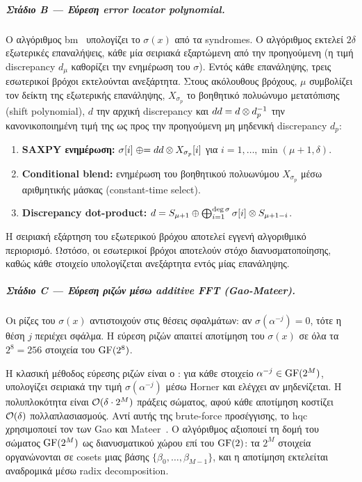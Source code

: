 \subparagraph{Στάδιο B — Εύρεση error locator polynomial.}
Ο αλγόριθμος \gls{bm}~\cite{Berlekamp1968,Massey1969} υπολογίζει το $\sigma(x)$ από τα syndromes.
Ο αλγόριθμος εκτελεί $2\delta$ εξωτερικές επαναλήψεις, κάθε μία
σειριακά εξαρτώμενη από την προηγούμενη (η τιμή discrepancy $d_\mu$
καθορίζει την ενημέρωση του $\sigma$).
Εντός κάθε επανάληψης, τρεις εσωτερικοί βρόχοι εκτελούνται ανεξάρτητα. Στους ακόλουθους βρόχους, $\mu$ συμβολίζει τον δείκτη της εξωτερικής επανάληψης, $X_{\sigma_p}$ το βοηθητικό πολυώνυμο μετατόπισης (shift polynomial), $d$ την αρχική discrepancy και $dd = d \otimes d_p^{-1}$ την κανονικοποιημένη τιμή της ως προς την προηγούμενη μη μηδενική discrepancy $d_p$:

\begin{enumerate}
  \item \textbf{SAXPY ενημέρωση:} $\sigma[i] \mathrel{\oplus}= dd \otimes X_{\sigma_p}[i]$ για $i = 1, \ldots, \min(\mu+1, \delta)$.
  \item \textbf{Conditional blend:} ενημέρωση του βοηθητικού πολυωνύμου
    $X_{\sigma_p}$ μέσω αριθμητικής μάσκας (constant-time select).
  \item \textbf{Discrepancy dot-product:} $d = S_{\mu+1} \oplus
    \bigoplus_{i=1}^{\deg\sigma} \sigma[i] \otimes S_{\mu+1-i}$.
\end{enumerate}
Η σειριακή εξάρτηση του εξωτερικού βρόχου αποτελεί εγγενή αλγοριθμικό
περιορισμό. Ωστόσο, οι εσωτερικοί βρόχοι αποτελούν στόχο διανυσματοποίησης, 
καθώς κάθε στοιχείο υπολογίζεται ανεξάρτητα εντός μίας επανάληψης.

\subparagraph{Στάδιο C — Εύρεση ριζών μέσω additive FFT (Gao-Mateer).}
Οι ρίζες του $\sigma(x)$ αντιστοιχούν στις θέσεις σφαλμάτων: αν
$\sigma(\alpha^{-j}) = 0$, τότε η θέση $j$ περιέχει σφάλμα.
Η εύρεση ριζών απαιτεί αποτίμηση του $\sigma(x)$ σε όλα τα $2^8 = 256$
στοιχεία του $\mathrm{GF}(2^8)$.

Η κλασική μέθοδος εύρεσης ριζών είναι ο :
για κάθε στοιχείο $\alpha^{-j} \in \mathrm{GF}(2^M)$, υπολογίζει σειριακά την τιμή
$\sigma(\alpha^{-j})$ μέσω Horner και ελέγχει αν μηδενίζεται.
Η πολυπλοκότητα είναι $\mathcal{O}(\delta \cdot 2^M)$ πράξεις σώματος, αφού κάθε
αποτίμηση κοστίζει $\mathcal{O}(\delta)$ πολλαπλασιασμούς.
Αντί αυτής της brute-force προσέγγισης, το \gls{hqc} χρησιμοποιεί τον
 των Gao και Mateer~\cite{GaoMateer2010}.
Ο αλγόριθμος αξιοποιεί τη δομή του σώματος $\mathrm{GF}(2^M)$ ως διανυσματικού
χώρου επί του $\mathrm{GF}(2)$: τα $2^M$ στοιχεία οργανώνονται σε cosets μιας
βάσης $\{\beta_0, \ldots, \beta_{M-1}\}$, και η αποτίμηση εκτελείται
αναδρομικά μέσω radix decomposition.

